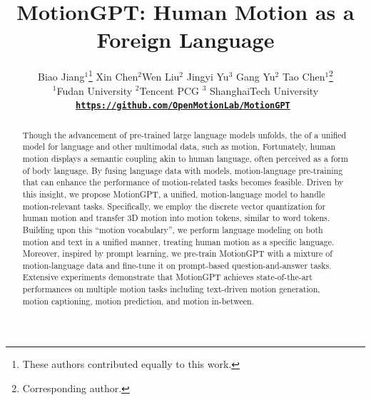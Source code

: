 \documentclass{article}
\title{MotionGPT: Human Motion as a Foreign Language}
\author{Biao Jiang$^{1}$\thanks{These authors contributed equally to this work.} \quad\quad Xin Chen$^{2}$\footnotemark[1] \quad\quad Wen Liu$^{2}$ \quad\quad Jingyi Yu$^{3}$ \quad\quad Gang Yu$^{2}$ \quad\quad Tao Chen$^{1}$\thanks{Corresponding author.} 
\\ $^{1}$Fudan University \quad\quad\quad$^{2}$Tencent PCG \quad\quad\quad$^{3}$ ShanghaiTech University \\
\tt \small \textbf{\href{https://github.com/OpenMotionLab/MotionGPT}{https://github.com/OpenMotionLab/MotionGPT}}
}
\begin{document}
\maketitle


\begin{abstract}
  Though the advancement of pre-trained large language models unfolds, the  of  a unified model for language and other multimodal data, such as motion,  %
  Fortunately, human motion displays a semantic coupling akin to human language, often perceived as a form of body language.
  By fusing language data with  models,%
  motion-language pre-training that can enhance the performance of motion-related tasks becomes feasible. %
  Driven by this insight, we propose MotionGPT, a unified,  motion-language model to handle  motion-relevant tasks.
  Specifically, we employ the discrete vector quantization for human motion and transfer 3D motion into motion tokens, similar to  word tokens. 
  Building upon this ``motion vocabulary'', we perform language modeling on both motion and text in a unified manner, treating human motion as a specific language.
  Moreover, inspired by prompt learning, we pre-train MotionGPT with a mixture of motion-language data and fine-tune it on prompt-based question-and-answer tasks.
  Extensive experiments demonstrate that MotionGPT achieves state-of-the-art performances on multiple motion tasks including text-driven motion generation, motion captioning, motion prediction, and motion in-between.
  
\end{abstract}






% 

\end{document}
